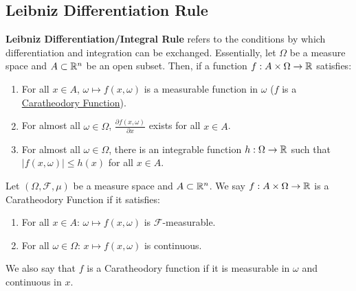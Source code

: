 \subsection{Leibniz Differentiation Rule}
\label{sec:leib_diff_rule}
\textbf{Leibniz Differentiation/Integral Rule} refers to the conditions by which differentiation and integration can be exchanged. Essentially, let $\Omega$ be a measure space and $A\subset\mathbb{R}^n$ be an open subset. Then, if a function $f:A \times \Omega \to \mathbb{R}$ satisfies:
\begin{enumerate}
	\item For all $x\in A$, $\omega\mapsto f(x, \omega)$ is a measurable function in $\omega$ ($f$ is a \underline{Caratheodory Function}).	
	\item For almost all $\omega\in\Omega$, $\frac{\partial f(x, \omega)}{\partial x}$ exists for all $x\in A$.
	\item For almost all $\omega\in\Omega$, there is an integrable function $h:\Omega\to\mathbb{R}$ such that $|f(x, \omega)|\le h(x)$ for all $x\in A$.
\end{enumerate} 

\begin{definition}
	Let $(\Omega, \mathcal{F}, \mu)$ be a measure space and $A\subset\mathbb{R}^n$. We say $f: A \times \Omega \to \mathbb{R}$ is a Caratheodory Function if it satisfies:
	\begin{enumerate}
		\item For all $x\in A$: $\omega\mapsto f(x, \omega)$ is $\mathcal{F}$-measurable.	
		\item For all $\omega\in\Omega$: $x\mapsto f(x, \omega)$ is continuous.
	\end{enumerate}

	\noindent We also say that $f$ is a Caratheodory function if it is measurable in $\omega$ and continuous in $x$.
\end{definition} 
